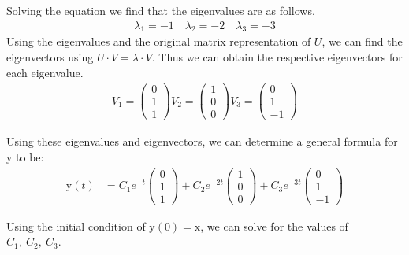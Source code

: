 \documentclass[10pt]{article}
\begin{document}
\begin{multicols}{2}
  Solving the equation we find that the eigenvalues are as follows.
  \begin{align*}
    \lambda_1 = -1 \quad \lambda_2 = -2 \quad \lambda_3 = -3
  \end{align*}
  Using the eigenvalues and the original matrix representation of $U$, we can find the eigenvectors
  using $U\cdot V = \lambda \cdot V$. Thus we can obtain the respective eigenvectors for each
  eigenvalue.
  \begin{align*}
    V_1 = \begin{pmatrix}0\\1\\1\end{pmatrix}
    V_2 = \begin{pmatrix}1\\0\\0\end{pmatrix}
    V_3 = \begin{pmatrix}0\\1\\-1\end{pmatrix}
  \end{align*}

  Using these eigenvalues and eigenvectors, we can determine a general formula
  for $\mathrm{y}$ to be:
  \begin{align*}
    \mathrm{y}\left(t\right) &= C_{1}e^{-t}\begin{pmatrix}0\\1\\1\end{pmatrix} +
    C_{2}e^{-2t}\begin{pmatrix}1\\0\\0\end{pmatrix} +
    C_{3}e^{-3t}\begin{pmatrix}0\\1\\-1\end{pmatrix}
  \end{align*}

  Using the initial condition of $\mathrm{y}\left(0\right) = \mathrm{x}$, we can
  solve for the values of $C_1,\ C_2,\ C_3$.


\end{multicols}
\end{document}
